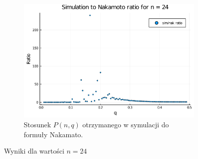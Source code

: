 \documentclass{article}
\begin{document}
\begin{figure}[H]
            \begin{subfigure}{0.65\textwidth}
                \includegraphics[width=\linewidth]{img/mc_to_na_n=24.png}
                \caption{Stosunek $P(n,q)$ otrzymanego w symulacji do formuły Nakamato.}
            \end{subfigure}
    
            \caption{Wyniki dla wartości $n = 24$}
        \end{figure}
\end{document}
